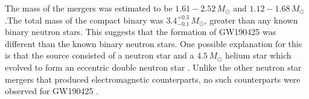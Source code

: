 The mass of the mergers was estimated to be $1.61-2.52\,M_\odot$ and $1.12 - 1.68\,M_\odot$.The total mass of the compact binary was $3.4_{-0.1}^{+0.3}\, M_\odot$, greater than any known binary neutron stars. This suggests that the formation of GW190425 was different than the known binary neutron stars. One possible explanation for this is that the source consisted of a neutron star and a $4.5\,M_\odot$ helium star which evolved to form an eccentric double neutron star \cite{Romero_Shaw_2020}. Unlike the other neutron star mergers that produced electromagnetic counterparts, no such counterparts were observed for GW190425 \cite{GW190425_1}.



\pagebreak
